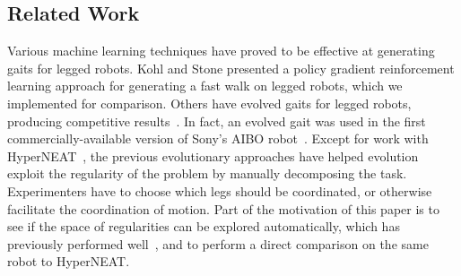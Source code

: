 \subsection{Related Work}

Various machine learning techniques have proved to be effective at
generating gaits for legged robots. Kohl and Stone presented a policy
gradient reinforcement learning approach for generating a fast walk on
legged robots\cite{kohl}, which we implemented for comparison. Others
have evolved gaits for legged robots, producing competitive
results~\cite{chernova2005evolutionary, hornby2005autonomous, zykov,
  clune2009evolving, clune2011performance, clune2009hybrid,
  clune2009sensitivity, tellez2006evolving, valsalam2008modular}. In
fact, an evolved gait was used in the first commercially-available
version of Sony's AIBO robot~\cite{hornby2005autonomous}. Except for
work with HyperNEAT~\cite{clune2009evolving, clune2011performance,
  clune2009hybrid, clune2009sensitivity}, the previous evolutionary
approaches have helped evolution exploit the regularity of the problem
by manually decomposing the task. Experimenters have
to choose which legs should be coordinated, or otherwise facilitate
the coordination of motion. Part of the motivation of this paper
is to see if the space of regularities can be explored automatically,
which has previously performed well~\cite{valsalam2008modular}, and to
perform a direct comparison on the same robot to HyperNEAT.

